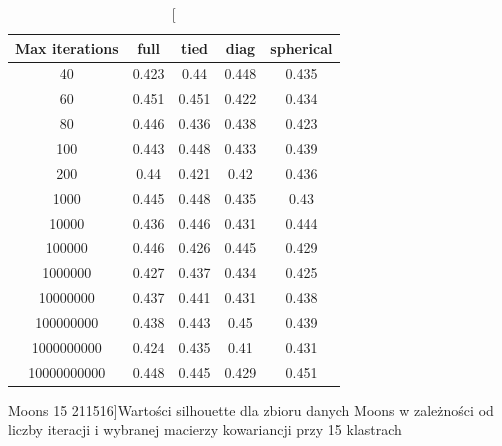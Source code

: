\documentclass{classrep}
\begin{document}
{{            \begin{table}[!htbp]
                \begin{minipage}{1\textwidth}
                \centering
                \begin{tabular}{|c|c|c|c|c|}
                \hline
                Max iterations & full & tied & diag & spherical \\ \hline
                40 & 0.423 & 0.44 & 0.448 & 0.435 \\ \hline
                60 & 0.451 & 0.451 & 0.422 & 0.434 \\ \hline
                80 & 0.446 & 0.436 & 0.438 & 0.423 \\ \hline
                100 & 0.443 & 0.448 & 0.433 & 0.439 \\ \hline
                200 & 0.44 & 0.421 & 0.42 & 0.436 \\ \hline
                1000 & 0.445 & 0.448 & 0.435 & 0.43 \\ \hline
                10000 & 0.436 & 0.446 & 0.431 & 0.444 \\ \hline
                100000 & 0.446 & 0.426 & 0.445 & 0.429 \\ \hline
                1000000 & 0.427 & 0.437 & 0.434 & 0.425 \\ \hline
                10000000 & 0.437 & 0.441 & 0.431 & 0.438 \\ \hline
                100000000 & 0.438 & 0.443 & 0.45 & 0.439 \\ \hline
                1000000000 & 0.424 & 0.435 & 0.41 & 0.431 \\ \hline
                10000000000 & 0.448 & 0.445 & 0.429 & 0.451 \\ \hline
                \end{tabular}
                \caption
                [Moons 15 211516]{Wartości silhouette dla zbioru danych Moons w
                zależności od liczby iteracji i wybranej macierzy kowariancji przy 15
                klastrach}
                \label{Moons_15_211516}
                \end{minipage}
                \hfill            
            

\end{table}}}
\end{document}

